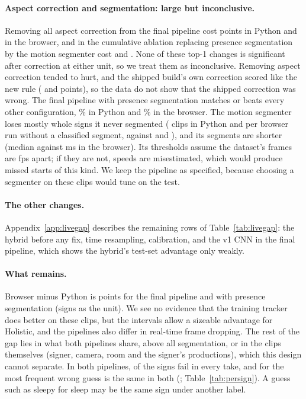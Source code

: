 \paragraph{Aspect correction and segmentation: large but inconclusive.}
Removing all aspect correction from the final pipeline cost  points in
Python and  in the browser, and in the cumulative ablation replacing
presence segmentation by the motion segmenter cost  and
. None of these
top-1 changes is significant after correction at either unit, so we treat them as inconclusive.
Removing aspect correction tended to hurt, and the shipped build's own correction scored like the
new rule ( and  points), so the
data do not show that the shipped correction was wrong. The final pipeline with presence
segmentation matches or beats every other configuration, \% in Python and
\% in the browser. The motion segmenter loses mostly whole signs it never
segmented ( clips in Python and  per browser run
without a classified segment, against  and ),
and its segments are shorter (median  against
 ms in the browser). Its thresholds assume the dataset's frames are
 fps apart; if they are not, speeds are misestimated, which would produce missed
starts of this kind. We keep the pipeline as specified, because choosing a segmenter on these clips
would tune on the test.

\paragraph{The other changes.}
Appendix~\ref{app:livegap} describes the remaining rows of Table~\ref{tab:livegap}: the hybrid
before any fix, time resampling, calibration, and the v1 CNN in the final pipeline, which shows
the hybrid's test-set advantage only weakly.

\paragraph{What remains.}
Browser minus Python is  points  for the final pipeline
and   with presence segmentation (signs as the unit).
We see no evidence that the training tracker does better on these clips, but the intervals allow
a sizeable advantage for Holistic, and the pipelines also differ in real-time frame dropping. The
rest of the gap lies in what both pipelines share, above all segmentation, or in the clips
themselves (signer, camera, room and the signer's productions), which this design cannot
separate. In both pipelines,  of the  signs fail in every take, and for  the most frequent wrong guess is the same in both
(; Table~\ref{tab:persign}). A guess such as sleepy for sleep may be the
same sign under another label.

